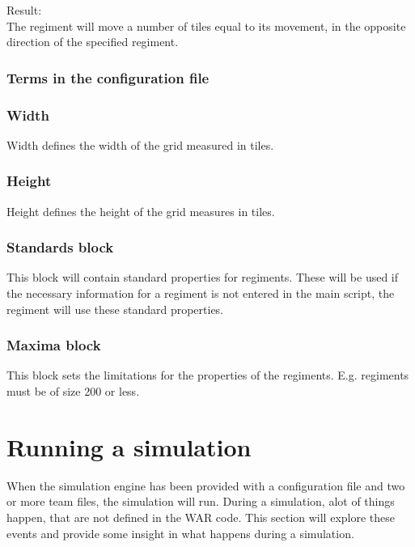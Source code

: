 		Result: \\
		The regiment will move a number of tiles equal to its movement, in the opposite direction of the specified regiment.
				
		\subsubsection{Terms in the configuration file}
		
		\subsubsection{Width}
		Width defines the width of the grid measured in tiles.
		
		\subsubsection{Height}
		Height defines the height of the grid measures in tiles.
		
		\subsubsection{Standards block}
		This block will contain standard properties for regiments. These will be used if the necessary 
		information for a regiment is not entered in the main script, the regiment will use these standard properties.
		
		\subsubsection{Maxima block}
		This block sets the limitations for the properties of the regiments. E.g. regiments must be of size 200 or less.

\section{ Running a simulation }
	When the simulation engine has been provided with a configuration file and two or more team files, the simulation will run. During a simulation, alot of things happen, that are not defined in the WAR code. This section will explore these events and provide some insight in what happens during a simulation.
